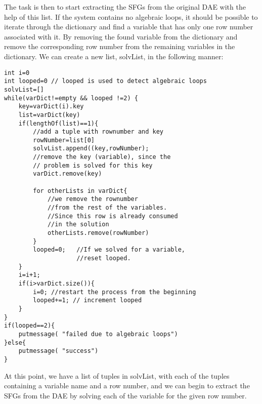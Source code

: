 The task is then to start extracting the SFGs from the original DAE with the help of this list. If the system contains no algebraic loops, it should be possible to iterate through the dictionary and find a variable that has only one row number associated with it. By removing the found variable from the dictionary and remove the corresponding row number from the remaining variables in the dictionary. We can create a  new list, solvList, in the following manner:
\begin{lstlisting}
int i=0
int looped=0 // looped is used to detect algebraic loops
solvList=[]
while(varDict!=empty && looped !=2) {
	key=varDict(i).key
	list=varDict(key)
	if(lengthOf(list)==1){
		//add a tuple with rownumber and key
		rowNumber=list[0]
		solvList.append((key,rowNumber);
		//remove the key (variable), since the
		// problem is solved for this key
		varDict.remove(key)
		
		for otherLists in varDict{
			//we remove the rownumber 
			//from the rest of the variables.
			//Since this row is already consumed
			//in the solution
			otherLists.remove(rowNumber)
		}
		looped=0; 	//If we solved for a variable, 
					//reset looped.
	}
	i=i+1;
	if(i>varDict.size()){
		i=0; //restart the process from the beginning
		looped+=1; // increment looped 	
	}			
}
if(looped==2){
	putmessage( "failed due to algebraic loops")
}else{
	putmessage( "success")
}

\end{lstlisting}

At this point, we have a list of tuples in solvList, with each of the tuples containing a variable name and a row number, and we can begin to extract the SFGs from the DAE by solving each of the variable for the given row number.